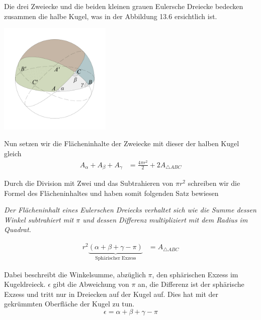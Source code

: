 \begin{refsection}
Die drei Zweiecke und die beiden kleinen grauen Eulersche Dreiecke bedecken zusammen die halbe Kugel, was in der Abbildung 13.6 ersichtlich ist.

\begin{center}
        \includegraphics[width=0.4\textwidth]{kugel/HalbeKugel.jpg}
\end{center}

Nun setzen wir die Flächeninhalte der Zweiecke mit dieser der halben Kugel gleich
\begin{align*}
A_{ \alpha } + A_{ \beta } + A_{ \gamma } &= \frac{ 4\pi r^{ 2 } }{ 2 } + 2A_{ \triangle{ ABC }}
\end{align*}

Durch die Division mit Zwei und das Subtrahieren von $\pi r^2$ schreiben wir die Formel des Flächeninhaltes und haben somit folgenden Satz bewiesen
\begin{satz} \textit{Der Flächeninhalt eines Eulerschen Dreiecks verhaltet sich wie die Summe dessen Winkel subtrahiert mit $\pi$ und dessen Differenz multipliziert mit dem Radius im Quadrat.}
\label{skript:kugel:satz:Flaecheninhalt}
\end{satz}

\begin{align*}
r^{ 2 }\underbrace{(\alpha + \beta + \gamma - \pi)}_{\text{Sphärischer Exzess}} &= A_{ \triangle{ ABC }}  
\end{align*}

Dabei beschreibt die Winkelsumme, abzüglich $\pi$, den sphärischen Exzess im Kugeldreieck.
$\epsilon$ gibt die Abweichung von $\pi$ an, die Differenz ist der sphärische Exzess und tritt nur in Dreiecken auf der Kugel auf. 
Dies hat mit der gekrümmten Oberfläche der Kugel zu tun.
\begin{equation}
\epsilon = \alpha + \beta + \gamma - \pi
\end{equation}


\end{refsection}
